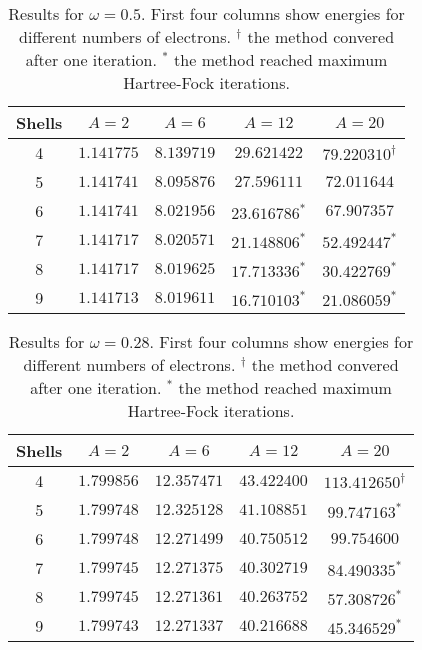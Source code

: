 \documentclass[11pt]{article}
\begin{document}
\begin{table}[H]
	\centering
	\caption{Results for $\omega = 0.5$. First four columns show energies for different numbers of electrons. $^\dagger$ the method convered after one iteration. $^*$ the method reached maximum Hartree-Fock iterations.}
	\begin{tabular}{c c c c c}
		\\ \hline \hline
		Shells 	& $A = 2$	& $A = 6$ 	& $A = 12$ 	& $A = 20$ 	\\ \hline
         4 & $  1.141775$ & $  8.139719$ & $ 29.621422$ & $ 79.220310^\dagger$  \\ 
         5 & $  1.141741$ & $  8.095876$ & $ 27.596111$ & $ 72.011644$  \\ 
         6 & $  1.141741$ & $  8.021956$ & $ 23.616786^*$ & $ 67.907357$  \\ 
         7 & $  1.141717$ & $  8.020571$ & $ 21.148806^*$ & $ 52.492447^*$  \\ 
         8 & $  1.141717$ & $  8.019625$ & $ 17.713336^*$ & $ 30.422769^*$  \\ 
         9 & $  1.141713$ & $  8.019611$ & $ 16.710103^*$ & $ 21.086059^*$  \\ 
        \hline \hline
	\end{tabular}
	\label{tab:omega05}
\end{table}

\begin{table}[H]
	\centering
	\caption{Results for $\omega = 0.28$. First four columns show energies for different numbers of electrons. $^\dagger$ the method convered after one iteration. $^*$ the method reached maximum Hartree-Fock iterations.}
	\begin{tabular}{c c c c c}
		\\ \hline \hline
		Shells 	& $A = 2$	& $A = 6$ 	& $A = 12$ 	& $A = 20$ 	\\ \hline
         4 & $  1.799856$ & $ 12.357471$ & $ 43.422400$ & $113.412650^\dagger$  \\ 
         5 & $  1.799748$ & $ 12.325128$ & $ 41.108851$ & $ 99.747163^*$  \\ 
         6 & $  1.799748$ & $ 12.271499$ & $ 40.750512$ & $ 99.754600$  \\ 
         7 & $  1.799745$ & $ 12.271375$ & $ 40.302719$ & $ 84.490335^*$  \\ 
         8 & $  1.799745$ & $ 12.271361$ & $ 40.263752$ & $ 57.308726^*$  \\ 
         9 & $  1.799743$ & $ 12.271337$ & $ 40.216688$ & $ 45.346529^*$  \\ 
        \hline \hline
	\end{tabular}
	\label{tab:omega028}
\end{table}
\end{document}
